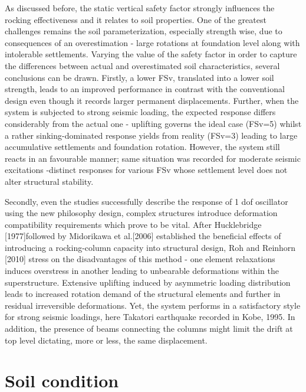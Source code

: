 \documentclass[10pt,a4paper]{report}
\begin{document}
As discussed before, the static vertical safety factor strongly influences the rocking effectiveness and it relates to soil properties. One of the greatest challenges remains the soil parameterization, especially strength wise, due to consequences of an overestimation - large rotations at foundation level along with intolerable settlements. Varying the value of the safety factor in order to capture the differences between actual and overestimated soil characteristics, several conclusions can be drawn. Firstly, a lower FSv, translated into a lower soil strength, leads to an improved performance in contrast with the conventional design even though it records larger permanent displacements. Further, when the system is subjected to strong seismic loading, the expected response differs considerably from the actual one - uplifting governs the ideal case (FSv=5) whilst a rather sinking-dominated response yields from reality (FSv=3) leading to large accumulative settlements and foundation rotation. However, the system still reacts in an favourable manner; same situation was recorded for moderate seismic excitations -distinct responses for various FSv whose settlement level does not alter structural stability. 

Secondly, even the studies successfully describe the response of 1 dof oscillator using the new philosophy design, complex structures introduce deformation compatibility requirements which prove to be vital. After Hucklebridge [1977]followed by Midorikawa et al.[2006] established the beneficial effects of introducing a rocking-column capacity into structural design, Roh and Reinhorn [2010] stress on the disadvantages of this method - one element relaxations induces overstress in another leading to unbearable deformations within the superstructure. Extensive uplifting induced by asymmetric loading distribution leads to increased rotation demand of the structural elements and further in residual irreversible deformations. Yet, the system performs in a satisfactory style for strong seismic loadings, here Takatori earthquake recorded in Kobe, 1995. In addition, the presence of beams connecting the columns might limit the drift at top level dictating, more or less, the same displacement.

\section{Soil condition}
\end{document}
